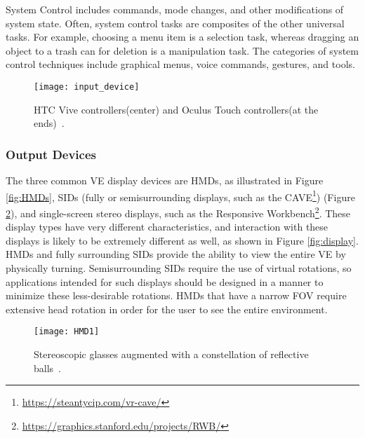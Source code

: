 System Control includes commands, mode changes, and other modifications of system state. 
Often, system control tasks are composites of the other universal tasks. For example, choosing
a menu item is a selection task, whereas dragging an object to a trash can for deletion is a 
manipulation task. The categories of system control techniques include graphical 
menus, voice commands, gestures, and tools.


\begin{figure}[h!]
    \centering
    \texttt{[image: input\_device]}
    \caption{HTC Vive controllers(center) and Oculus Touch controllers(at the ends)~\cite{article_input_devices}.}
    \label{fig:input_device}
\end{figure}


\subsubsection{Output Devices}
\label{sec:output_devices}

The three common \gls{VE} display devices are \glspl{HMD}, as illustrated in Figure \ref{fig:HMDs}, \glspl{SID} (fully or 
semisurrounding displays, such as the \gls{CAVE}\footnote{\url{https://steantycip.com/vr-cave/}}) (Figure \ref{fig:HMD1}), and single-screen stereo displays, such as the Responsive Workbench\footnote{\url{https://graphics.stanford.edu/projects/RWB/}}. 
These display types have very different characteristics, and interaction with these displays is likely to be extremely different as well, as shown in Figure \ref{fig:display}. \glspl{HMD} and fully surrounding \glspl{SID} provide the ability to view the entire \gls{VE} by physically turning. Semisurrounding \glspl{SID} require the use of virtual rotations, so applications intended for such 
displays should be designed in a manner to minimize these less-desirable rotations. \glspl{HMD} that have a narrow \gls{FOV} require extensive head rotation in order for the user to see the entire environment. 


\begin{figure}[h!]
    \centering
    \texttt{[image: HMD1]}
    \caption{Stereoscopic glasses augmented with a constellation of reflective balls~\cite{SHERMAN2019258}.} 
    \label{fig:HMD1}
\end{figure}

